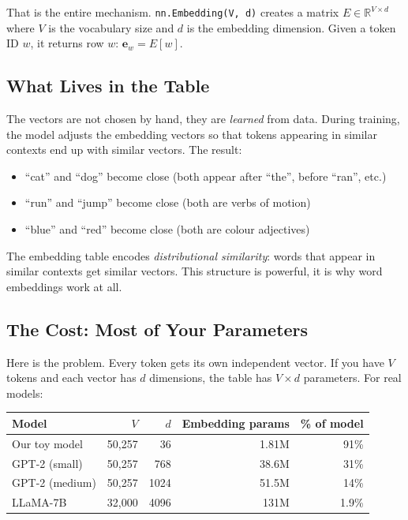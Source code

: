 \documentclass[11pt, a4paper]{article}
\newcommand{\R}{\mathbb{R}}
\theoremstyle{remark}
\begin{document}
That is the entire mechanism.
\texttt{nn.Embedding(V, d)} creates a matrix $E \in \R^{V \times d}$ where $V$ is the vocabulary size and $d$ is the embedding dimension.
Given a token ID $w$, it returns row $w$: $\mathbf{e}_w = E[w]$.

\subsection{What Lives in the Table}

The vectors are not chosen by hand, they are \emph{learned} from data.
During training, the model adjusts the embedding vectors so that tokens appearing in similar contexts end up with similar vectors.
The result:
\begin{itemize}[nosep]
    \item ``cat'' and ``dog'' become close (both appear after ``the'', before ``ran'', etc.)
    \item ``run'' and ``jump'' become close (both are verbs of motion)
    \item ``blue'' and ``red'' become close (both are colour adjectives)
\end{itemize}
The embedding table encodes \emph{distributional similarity}: words that appear in similar contexts get similar vectors.
This structure is powerful, it is why word embeddings work at all.

\subsection{The Cost: Most of Your Parameters}

Here is the problem.
Every token gets its own independent vector.
If you have $V$ tokens and each vector has $d$ dimensions, the table has $V \times d$ parameters.
For real models:

\begin{center}\small
\begin{tabular}{@{}lrrrr@{}}
\toprule
\textbf{Model} & $V$ & $d$ & \textbf{Embedding params} & \textbf{\% of model} \\
\midrule
Our toy model & 50,257 & 36 & 1.81M & 91\% \\
GPT-2 (small) & 50,257 & 768 & 38.6M & 31\% \\
GPT-2 (medium) & 50,257 & 1024 & 51.5M & 14\% \\
LLaMA-7B & 32,000 & 4096 & 131M & 1.9\% \\
\bottomrule
\end{tabular}
\end{center}
\end{document}
